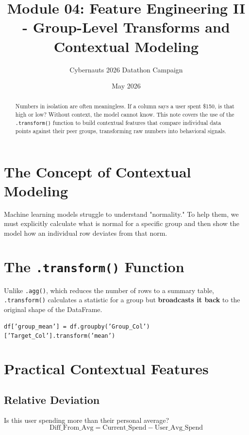 \documentclass{article}
\title{Module 04: Feature Engineering II - Group-Level Transforms and Contextual Modeling}
\author{Cybernauts 2026 Datathon Campaign}
\date{May 2026}
\begin{document}
\maketitle

\begin{abstract}
Numbers in isolation are often meaningless. If a column says a user spent \$150, is that high or low? Without context, the model cannot know. This note covers the use of the \texttt{.transform()} function to build contextual features that compare individual data points against their peer groups, transforming raw numbers into behavioral signals.
\end{abstract}

\tableofcontents
\newpage

\section{The Concept of Contextual Modeling}
Machine learning models struggle to understand "normality." To help them, we must explicitly calculate what is normal for a specific group and then show the model how an individual row deviates from that norm.

\section{The \texttt{.transform()} Function}
Unlike \texttt{.agg()}, which reduces the number of rows to a summary table, \texttt{.transform()} calculates a statistic for a group but \textbf{broadcasts it back} to the original shape of the DataFrame.

\begin{tcolorbox}[colback=blue!5!white,colframe=blue!75!black,title=Essential Syntax]
\texttt{df['group\_mean'] = df.groupby('Group\_Col')['Target\_Col'].transform('mean')}
\end{tcolorbox}

\section{Practical Contextual Features}

\subsection{Relative Deviation}
Is this user spending more than their personal average? 
\begin{equation}
    \text{Diff\_From\_Avg} = \text{Current\_Spend} - \text{User\_Avg\_Spend}
\end{equation}
\end{document}
